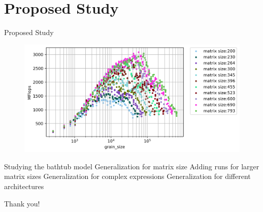 \documentclass[10pt]{beamer}
\begin{document}
\section{Proposed Study}
\begin{frame}{Proposed Study}
\begin{outline}	
	\begin{figure}[H]
		\centering
		\includegraphics[scale=.4]{images/fig11.png}	
		\label{fig20}
	\end{figure} 
	\1Studying the bathtub model
	\1Generalization for matrix size 
	\1Adding runs for larger matrix sizes
	\1Generalization for complex expressions
	\1Generalization for different architectures
\end{outline}
\end{frame}


\begin{frame}[standout]
  Thank you!
\end{frame}
\end{document}
